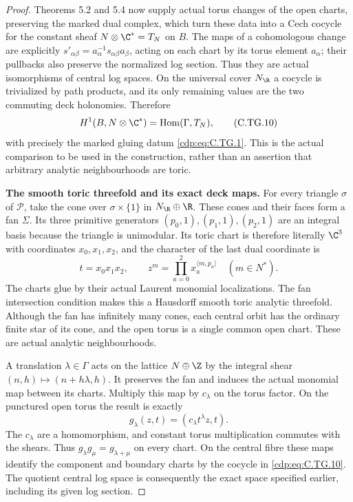 \begin{proof}
Theorems 5.2 and 5.4 now supply actual torus
changes of the open charts, preserving the
marked dual complex, which turn these data
into a Cech cocycle for the constant sheaf
$N\otimes\C^*=T_N$ on $B$.
The maps of a cohomologous change are explicitly
$s'_{\alpha\beta}=a_\alpha^{-1}
s_{\alpha\beta}a_\beta$, acting on each chart
by its torus element $a_\alpha$; their pullbacks
also preserve the normalized log section.
Thus they are actual isomorphisms of central
log spaces. On the universal cover
$N_{\R}$ a cocycle is trivialized by path
products, and its only remaining values are
the two commuting deck holonomies. Therefore
\[
 H^1(B,N\otimes\C^*)
       =\operatorname{Hom}(\Gamma,T_N),
\tag{C.TG.10}\label{cdp:eq:C.TG.10}
\]
with precisely the marked gluing datum \eqref{cdp:eq:C.TG.1}.
This is the actual comparison to be used in
the construction, rather than an assertion
that arbitrary analytic neighbourhoods are toric.

\par\medskip\noindent\textbf{The smooth toric threefold and its exact deck maps.}
For every triangle $\sigma$ of $\mathscr P$, take
the cone over $\sigma\times\{1\}$ in
$N_{\R}\oplus\R$. These cones and their faces
form a fan $\Sigma$. Its three primitive
generators $(p_0,1),(p_1,1),(p_2,1)$ are an
integral basis because the triangle is
unimodular. Its toric chart is therefore
literally $\C^3$ with coordinates $x_0,x_1,x_2$,
and the character of the last dual coordinate is
\[
                  t=x_0x_1x_2,
       \qquad z^m=\prod_{a=0}^2x_a^{\langle m,p_a\rangle}
                       \quad(m\in N^*).
\tag{C.TG.11}\label{cdp:eq:C.TG.11}
\]
The charts glue by their actual Laurent
monomial localizations. The fan intersection
condition makes this a Hausdorff smooth toric
analytic threefold. Although the fan has
infinitely many cones, each central orbit has
the ordinary finite star of its cone, and the
open torus is a single common open chart.
These are actual analytic neighbourhoods.

A translation $\lambda\in\Gamma$ acts on the
lattice $N\oplus\Z$ by the integral shear
$(n,h)\mapsto(n+h\lambda,h)$. It preserves
the fan and induces the actual monomial map
between its charts. Multiply this map by
$c_\lambda$ on the torus factor. On the
punctured open torus the result is exactly
\[
              g_\lambda(z,t)=(c_\lambda t^\lambda z,t).
\tag{C.TG.12}\label{cdp:eq:C.TG.12}
\]
The $c_\lambda$ are a homomorphism, and
constant torus multiplication commutes with
the shears. Thus $g_\lambda g_\mu=g_{\lambda+\mu}$
on every chart. On the central fibre these
maps identify the component and boundary
charts by the cocycle in \eqref{cdp:eq:C.TG.10}. The
quotient central log space is consequently
the exact space specified earlier, including
its given log section.


\end{proof}

